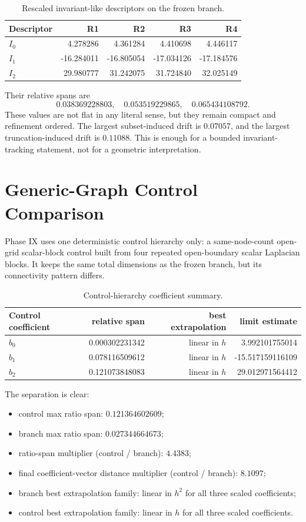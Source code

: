\documentclass[11pt]{article}
\begin{document}
\begin{table}[t]
\centering
\small
\begin{tabular}{@{}lrrrr@{}}
\toprule
Descriptor & R1 & R2 & R3 & R4 \\
\midrule
$I_0$ & 4.278286 & 4.361284 & 4.410698 & 4.446117 \\
$I_1$ & -16.284011 & -16.805054 & -17.034126 & -17.184576 \\
$I_2$ & 29.980777 & 31.242075 & 31.724840 & 32.025149 \\
\bottomrule
\end{tabular}
\caption{Rescaled invariant-like descriptors on the frozen branch.}
\label{tab:invariants}
\end{table}

Their relative spans are
\[
0.038369228803,\quad 0.053519229865,\quad 0.065434108792.
\]
These values are not flat in any literal sense, but they remain compact and refinement ordered. The largest subset-induced drift is $0.07057$, and the largest truncation-induced drift is $0.11088$. This is enough for a bounded invariant-tracking statement, not for a geometric interpretation.

\section{Generic-Graph Control Comparison}

Phase IX uses one deterministic control hierarchy only: a same-node-count open-grid scalar-block control built from four repeated open-boundary scalar Laplacian blocks. It keeps the same total dimensions as the frozen branch, but its connectivity pattern differs.

\begin{table}[t]
\centering
\small
\begin{tabular}{@{}lrrr@{}}
\toprule
Control coefficient & relative span & best extrapolation & limit estimate \\
\midrule
$b_0$ & 0.000302231342 & linear in $h$ & 3.992101755014 \\
$b_1$ & 0.078116509612 & linear in $h$ & -15.517159116109 \\
$b_2$ & 0.121073848083 & linear in $h$ & 29.012971564412 \\
\bottomrule
\end{tabular}
\caption{Control-hierarchy coefficient summary.}
\label{tab:control}
\end{table}

The separation is clear:
\begin{itemize}
\item control max ratio span: $0.121364602609$;
\item branch max ratio span: $0.027344664673$;
\item ratio-span multiplier (control / branch): $4.4383$;
\item final coefficient-vector distance multiplier (control / branch): $8.1097$;
\item branch best extrapolation family: linear in $h^2$ for all three scaled coefficients;
\item control best extrapolation family: linear in $h$ for all three scaled coefficients.
\end{itemize}
\end{document}
